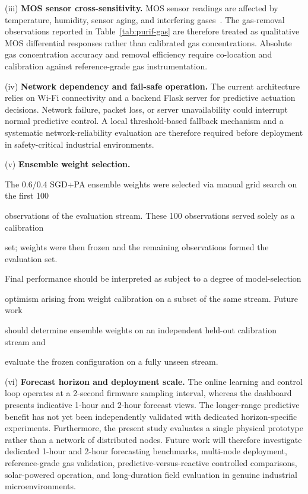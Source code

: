 \documentclass[12pt,a4paper]{article}
\begin{document}
(iii) \textbf{MOS sensor cross-sensitivity.}
MOS sensor readings are affected by temperature, humidity, sensor aging,
and interfering gases~\citep{mos2024trac,sensorcorrection2025npj}. The gas-removal observations
reported in Table~\ref{tab:purif-gas} are therefore treated as qualitative MOS differential
responses rather than calibrated gas concentrations. Absolute gas concentration accuracy and
removal efficiency require co-location and calibration against reference-grade gas instrumentation.

(iv) \textbf{Network dependency and fail-safe operation.}
The current architecture relies on Wi-Fi connectivity and a backend Flask server for predictive
actuation decisions. Network failure, packet loss, or server unavailability could interrupt normal
predictive control. A local threshold-based fallback mechanism and a systematic network-reliability
evaluation are therefore required before deployment in safety-critical industrial environments.

(v) \textbf{Ensemble weight selection.}

The 0.6/0.4 SGD+PA ensemble weights were selected via manual grid search on the first 100

observations of the evaluation stream. These 100 observations served solely as a calibration

set; weights were then frozen and the remaining observations formed the evaluation set.

Final performance should be interpreted as subject to a degree of model-selection

optimism arising from weight calibration on a subset of the same stream. Future work

should determine ensemble weights on an independent held-out calibration stream and

evaluate the frozen configuration on a fully unseen stream.



(vi) \textbf{Forecast horizon and deployment scale.}
The online learning and control loop operates at a 2-second firmware sampling interval, whereas
the dashboard presents indicative 1-hour and 2-hour forecast views. The longer-range predictive
benefit has not yet been independently validated with dedicated horizon-specific experiments.
Furthermore, the present study evaluates a single physical prototype rather than a network of
distributed nodes. Future work will therefore investigate dedicated 1-hour and 2-hour forecasting
benchmarks, multi-node deployment, reference-grade gas validation, predictive-versus-reactive
controlled comparisons, solar-powered operation, and long-duration field evaluation in genuine
industrial microenvironments.
\end{document}
